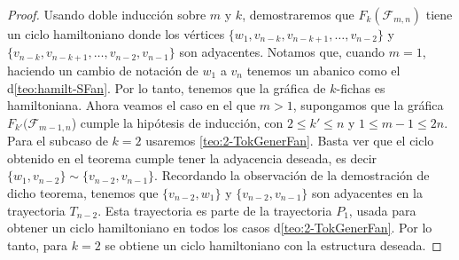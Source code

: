 \begin{proof}
    Usando doble inducci\'on sobre $m$ y $k$, demostraremos que
    $F_k(\mathcal{F}_{m,n})$ tiene un ciclo hamiltoniano donde los v\'ertices
    $\{w_1, v_{n-k}, v_{n-k+1}, \dots, v_{n-2}\}$ y $\{v_{n-k}, v_{n-k+1},
    \dots, v_{n-2}, v_{n-1}\}$ son adyacentes. Notamos que, cuando $m =1$,
    haciendo un cambio de notaci\'on de $w_1$ a $v_n$ tenemos un abanico como el
    d\cref{teo:hamilt-SFan}. Por lo tanto, tenemos que la gr\'afica de
    $k$-fichas es hamiltoniana. Ahora veamos el caso en el que $m>1$, supongamos
    que la gr\'afica $F_{k'}(\mathcal{F}_{m-1,n}$) cumple la hip\'otesis de
    inducci\'on, con $2\leq k'\leq n$ y $1 \leq m-1 \leq 2n$. Para el subcaso de
    $k=2$ usaremos \cref{teo:2-TokGenerFan}. Basta ver que el ciclo obtenido en
    el teorema cumple tener la adyacencia deseada, es decir $\{w_1,
    v_{n-2}\}\sim\{v_{n-2}, v_{n-1}\}$. Recordando la observaci\'on de la
    demostraci\'on de dicho teorema, tenemos que $\{v_{n-2},w_1\}$ y
    $\{v_{n-2},v_{n-1}\}$ son adyacentes en la trayectoria $T_{n-2}$. Esta
    trayectoria es parte de la trayectoria $P_1$, usada para obtener un ciclo
    hamiltoniano en todos los casos d\cref{teo:2-TokGenerFan}. Por lo
    tanto, para $k=2$ se obtiene un ciclo hamiltoniano con la estructura
    deseada.


\end{proof}
